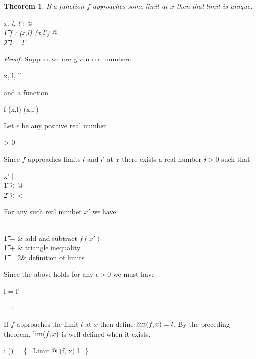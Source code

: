 \documentclass[11pt, oneside]{article}
\newtheorem{theorem}{Theorem}
\begin{document}
\begin{theorem}
If a function $f$ approaches some limit at $x$ then that limit is unique.
\begin{zed}
	\forall x, l, l': \R @ \\
	\t1	\forall f : \limRR(x,l) \cap \limRR(x,l') @ \\
	\t2		l = l'
\end{zed}
\end{theorem}

\begin{proof}
Suppose we are given real numbers
\begin{argue}
	x, l, l' \in \R 
\end{argue}
and a function
\begin{argue}
	f \in \limRR(x,l) \cap \limRR(x,l')
\end{argue}
Let $\epsilon$ be any positive real number
\begin{argue}
	\epsilon > 0
\end{argue}
Since $f$ approaches limits $l$ and $l'$ at $x$ there exists a real number $\delta > 0$ such that
\begin{argue}
	\forall x' \in \R |  \\
	\t1	\zeroR \ltR {}< \delta @ \\
	\t2		  < \epsilon \land {} < \epsilon
\end{argue}
For any such real number $x'$ we have
\begin{argue}
	 \\
	\t1	=  		& add and subtract $f(x')$ \\
	\t1	\leq {} +  	& triangle inequality \\
	\t1	= 2\epsilon					& definition of limits
\end{argue}
Since the above holds for any $\epsilon > 0$ we must have
\begin{argue}
	l = l'
\end{argue}

\end{proof}

If $f$ approaches the limit $l$ at $x$ then define $\operatorname{lim}(f,x) = l$.
By the preceding theorem, $\operatorname{lim}(f,x)$ is well-defined when it exists.
\begin{axdef}
	\limFR: (\R \pfun \R) \cross \R \pfun \R
\where
	\limFR = \{~ Limit @ (f, x) \mapsto l ~\}
\end{axdef}
\end{document}
